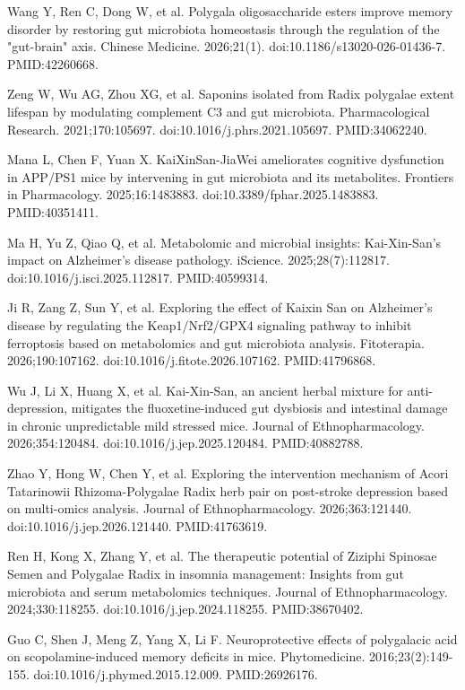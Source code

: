 \documentclass[12pt,oneside]{book}
\newcommand{\reff}[2]{\par\hangindent=7mm\hangafter=1\noindent[#1]\hspace{2mm}#2\par}
\begin{document}
\reff{22}{Wang Y, Ren C, Dong W, et al. Polygala oligosaccharide esters improve memory disorder by restoring gut microbiota homeostasis through the regulation of the "gut-brain" axis. Chinese Medicine. 2026;21(1). doi:10.1186/s13020-026-01436-7. PMID:42260668.}

\reff{23}{Zeng W, Wu AG, Zhou XG, et al. Saponins isolated from Radix polygalae extent lifespan by modulating complement C3 and gut microbiota. Pharmacological Research. 2021;170:105697. doi:10.1016/j.phrs.2021.105697. PMID:34062240.}

\reff{24}{Mana L, Chen F, Yuan X. KaiXinSan-JiaWei ameliorates cognitive dysfunction in APP/PS1 mice by intervening in gut microbiota and its metabolites. Frontiers in Pharmacology. 2025;16:1483883. doi:10.3389/fphar.2025.1483883. PMID:40351411.}

\reff{25}{Ma H, Yu Z, Qiao Q, et al. Metabolomic and microbial insights: Kai-Xin-San's impact on Alzheimer's disease pathology. iScience. 2025;28(7):112817. doi:10.1016/j.isci.2025.112817. PMID:40599314.}

\reff{26}{Ji R, Zang Z, Sun Y, et al. Exploring the effect of Kaixin San on Alzheimer's disease by regulating the Keap1/Nrf2/GPX4 signaling pathway to inhibit ferroptosis based on metabolomics and gut microbiota analysis. Fitoterapia. 2026;190:107162. doi:10.1016/j.fitote.2026.107162. PMID:41796868.}

\reff{27}{Wu J, Li X, Huang X, et al. Kai-Xin-San, an ancient herbal mixture for anti-depression, mitigates the fluoxetine-induced gut dysbiosis and intestinal damage in chronic unpredictable mild stressed mice. Journal of Ethnopharmacology. 2026;354:120484. doi:10.1016/j.jep.2025.120484. PMID:40882788.}

\reff{28}{Zhao Y, Hong W, Chen Y, et al. Exploring the intervention mechanism of Acori Tatarinowii Rhizoma-Polygalae Radix herb pair on post-stroke depression based on multi-omics analysis. Journal of Ethnopharmacology. 2026;363:121440. doi:10.1016/j.jep.2026.121440. PMID:41763619.}

\reff{29}{Ren H, Kong X, Zhang Y, et al. The therapeutic potential of Ziziphi Spinosae Semen and Polygalae Radix in insomnia management: Insights from gut microbiota and serum metabolomics techniques. Journal of Ethnopharmacology. 2024;330:118255. doi:10.1016/j.jep.2024.118255. PMID:38670402.}

\reff{30}{Guo C, Shen J, Meng Z, Yang X, Li F. Neuroprotective effects of polygalacic acid on scopolamine-induced memory deficits in mice. Phytomedicine. 2016;23(2):149-155. doi:10.1016/j.phymed.2015.12.009. PMID:26926176.}
\end{document}
